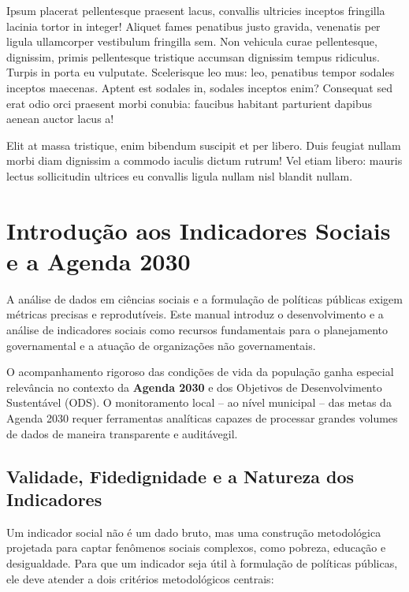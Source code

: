 \documentclass[
  brazilian,
  11pt,
  a4paper,
  open = right,
  twoside = true]{scrbook}
\begin{document}
Ipsum placerat pellentesque praesent lacus, convallis ultricies inceptos
fringilla lacinia tortor in integer! Aliquet fames penatibus justo
gravida, venenatis per ligula ullamcorper vestibulum fringilla sem. Non
vehicula curae pellentesque, dignissim, primis pellentesque tristique
accumsan dignissim tempus ridiculus. Turpis in porta eu vulputate.
Scelerisque leo mus: leo, penatibus tempor sodales inceptos maecenas.
Aptent est sodales in, sodales inceptos enim? Consequat sed erat odio
orci praesent morbi conubia: faucibus habitant parturient dapibus aenean
auctor lacus a!

Elit at massa tristique, enim bibendum suscipit et per libero. Duis
feugiat nullam morbi diam dignissim a commodo iaculis dictum rutrum! Vel
etiam libero: mauris lectus sollicitudin ultrices eu convallis ligula
nullam nisl blandit nullam.

\chapter{Introdução aos Indicadores Sociais e a Agenda
2030}\label{introduuxe7uxe3o-aos-indicadores-sociais-e-a-agenda-2030}

A análise de dados em ciências sociais e a formulação de políticas
públicas exigem métricas precisas e reprodutíveis. Este manual introduz
o desenvolvimento e a análise de indicadores sociais como recursos
fundamentais para o planejamento governamental e a atuação de
organizações não governamentais.

O acompanhamento rigoroso das condições de vida da população ganha
especial relevância no contexto da \textbf{Agenda 2030} e dos Objetivos
de Desenvolvimento Sustentável (ODS). O monitoramento local -- ao nível
municipal -- das metas da Agenda 2030 requer ferramentas analíticas
capazes de processar grandes volumes de dados de maneira transparente e
auditávegil.

\section{Validade, Fidedignidade e a Natureza dos
Indicadores}\label{validade-fidedignidade-e-a-natureza-dos-indicadores}

Um indicador social não é um dado bruto, mas uma construção metodológica
projetada para captar fenômenos sociais complexos, como pobreza,
educação e desigualdade. Para que um indicador seja útil à formulação de
políticas públicas, ele deve atender a dois critérios metodológicos
centrais:
\end{document}
